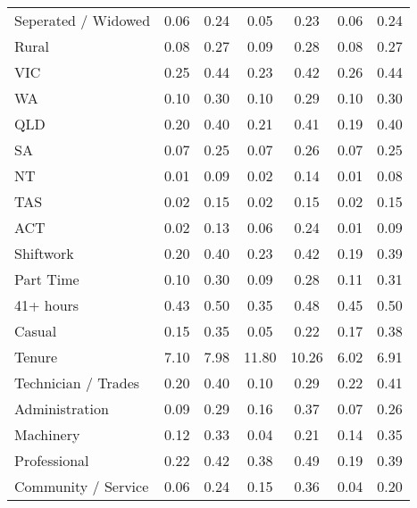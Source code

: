 {\begin{tabular}{l*{3}{cc}}
Seperated / Widowed &        0.06&        0.24&        0.05&        0.23&        0.06&        0.24\\
Rural               &        0.08&        0.27&        0.09&        0.28&        0.08&        0.27\\
VIC                 &        0.25&        0.44&        0.23&        0.42&        0.26&        0.44\\
WA                  &        0.10&        0.30&        0.10&        0.29&        0.10&        0.30\\
QLD                 &        0.20&        0.40&        0.21&        0.41&        0.19&        0.40\\
SA                  &        0.07&        0.25&        0.07&        0.26&        0.07&        0.25\\
NT                  &        0.01&        0.09&        0.02&        0.14&        0.01&        0.08\\
TAS                 &        0.02&        0.15&        0.02&        0.15&        0.02&        0.15\\
ACT                 &        0.02&        0.13&        0.06&        0.24&        0.01&        0.09\\
Shiftwork           &        0.20&        0.40&        0.23&        0.42&        0.19&        0.39\\
Part Time           &        0.10&        0.30&        0.09&        0.28&        0.11&        0.31\\
41+ hours           &        0.43&        0.50&        0.35&        0.48&        0.45&        0.50\\
Casual              &        0.15&        0.35&        0.05&        0.22&        0.17&        0.38\\
Tenure              &        7.10&        7.98&       11.80&       10.26&        6.02&        6.91\\
Technician / Trades &        0.20&        0.40&        0.10&        0.29&        0.22&        0.41\\
Administration      &        0.09&        0.29&        0.16&        0.37&        0.07&        0.26\\
Machinery           &        0.12&        0.33&        0.04&        0.21&        0.14&        0.35\\
Professional        &        0.22&        0.42&        0.38&        0.49&        0.19&        0.39\\
Community / Service &        0.06&        0.24&        0.15&        0.36&        0.04&        0.20\\

\end{tabular}}
